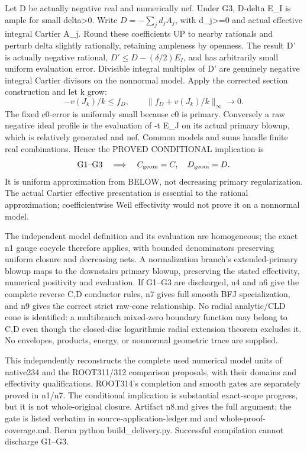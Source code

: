 \documentclass[11pt]{article}
\begin{document}
Let D be actually negative real and numerically nef. Under G3, D-delta E\_I is ample for small delta>0. Write \(D=-\sum_j d_j A_j\), with d\_j>=0 and actual effective integral Cartier A\_j. Round these coefficients UP to nearby rationals and perturb delta slightly rationally, retaining ampleness by openness. The result D' is actually negative rational, \(D'\le D-(\delta/2)E_I\), and has arbitrarily small uniform evaluation error. Divisible integral multiples of D' are genuinely negative integral Cartier divisors on the nonnormal model. Apply the corrected section construction and let k grow:
\[
 -v(J_k)/k\le f_D,\qquad \|f_D+v(J_k)/k\|_\infty\longrightarrow0.
\]
The fixed c0-error is uniformly small because c0 is primary. Conversely a raw negative ideal profile is the evaluation of -t E\_J on its actual primary blowup, which is relatively generated and nef. Common models and sums handle finite real combinations. Hence the PROVED CONDITIONAL implication is
\[
 \text{G1--G3}\quad\Longrightarrow\quad C_{\rm geom}=C,\quad D_{\rm geom}=D.
\]
It is uniform approximation from BELOW, not decreasing primary regularization. The actual Cartier effective presentation is essential to the rational approximation; coefficientwise Weil effectivity would not prove it on a nonnormal model.

The independent model definition and its evaluation are homogeneous; the exact n1 gauge cocycle therefore applies, with bounded denominators preserving uniform closure and decreasing nets. A normalization branch's extended-primary blowup maps to the downstairs primary blowup, preserving the stated effectivity, numerical positivity and evaluation. If G1--G3 are discharged, n4 and n6 give the complete reverse C,D conductor rules, n7 gives full smooth BFJ specialization, and n9 gives the correct strict raw-cone relationship. No radial analytic/CLD cone is identified: a multibranch mixed-zero boundary function may belong to C,D even though the closed-disc logarithmic radial extension theorem excludes it. No envelopes, products, energy, or nonnormal geometric trace are supplied.

This independently reconstructs the complete used numerical model units of native234 and the ROOT311/312 comparison proposals, with their domains and effectivity qualifications. ROOT314's completion and smooth gates are separately proved in n1/n7. The conditional implication is substantial exact-scope progress, but it is not whole-original closure. Artifact n8.md gives the full argument; the gate is listed verbatim in source-application-ledger.md and whole-proof-coverage.md. Rerun python build\_delivery.py. Successful compilation cannot discharge G1--G3.
\end{document}
